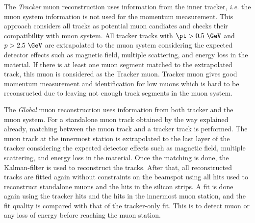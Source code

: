 The \textit{Tracker} muon reconstruction uses information from  
the inner tracker, \textit{i.e.} the muon system information is not used
for the momentum measurement. This approach considers all tracks as 
potential muon candiates and checks their compatibility with 
muon system. All tracker tracks with $\pt>0.5~\GeV$ and $p>2.5~\GeV$ 
are extrapolated to the muon system considering the expected detector effects 
such as magnetic field, multiple scattering, and energy loss in the material. 
If there is at least one muon segment matched to the 
extrapolated track, this muon is considered as the Tracker muon. 
Tracker muon gives good momentum measurement and identification for low \pt{} muons
which is hard to be reconsructed due to leaving not enough track segments 
in the muon system. 

The \textit{Global} muon reconstruction uses information from both tracker 
and the muon system. For a standalone muon track obtained by the way explained 
already, matching between the muon track and a tracker track is performed. 
The muon track at the innermost station is extrapolated to the last layer 
of the tracker considering the expected detector effects 
such as magnetic field, multiple scattering, and energy loss in the material.
Once the matching is done, the Kalman-filter is used to reconstruct the tracks. 
After that, all reconstructed tracks are fitted again without constraints on the 
beamspot using all hits used to reconstruct standalone muons and the hits 
in the silicon strips. A fit is done again using the tracker hits and the 
hits in the innermost muon station, and the fit quality is compared with 
that of the tracker-only fit. This is to detect muon \brem{}  or 
any loss of energy before reaching the muon station.

